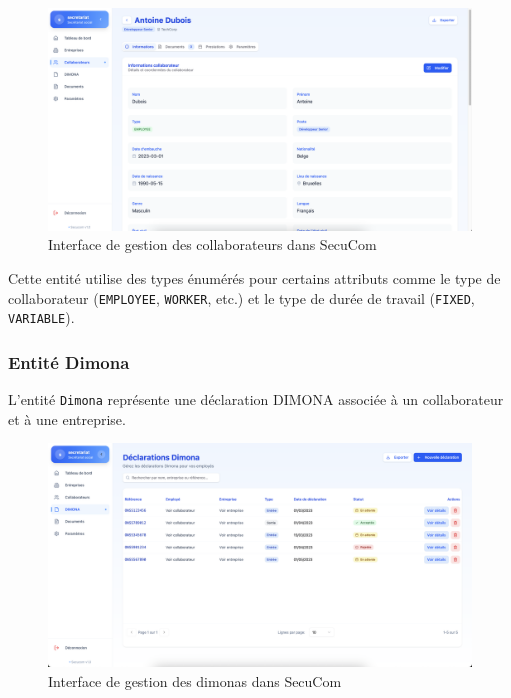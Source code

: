 \vspace{0.5cm}

\begin{figure}[H]
  \centering
  \includegraphics[width=1\textwidth]{SecuComPreviewCollaboratorInfos.png}
  \caption{Interface de gestion des collaborateurs dans SecuCom}
  \label{fig:collaboratorInterface}
\end{figure}

\vspace{0.5cm}

Cette entité utilise des types énumérés pour certains attributs comme le type de collaborateur (\texttt{EMPLOYEE}, \texttt{WORKER}, etc.) et le type de durée de travail (\texttt{FIXED}, \texttt{VARIABLE}).

\subsubsection{Entité Dimona}

L'entité \texttt{Dimona} représente une déclaration DIMONA associée à un collaborateur et à une entreprise.

\vspace{0.5cm}

\begin{figure}[H]
  \centering
  \includegraphics[width=1\textwidth]{SecuComPreviewDimona.png}
  \caption{Interface de gestion des dimonas dans SecuCom}
  \label{fig:companyInterface}
\end{figure}

